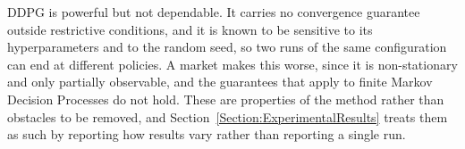 

DDPG is powerful but not dependable. It carries no convergence guarantee outside restrictive conditions, and it is known to be sensitive to its hyperparameters and to the random seed, so two runs of the same configuration can end at different policies. A market makes this worse, since it is non-stationary and only partially observable, and the guarantees that apply to finite Markov Decision Processes do not hold. These are properties of the method rather than obstacles to be removed, and Section~\ref{Section:ExperimentalResults} treats them as such by reporting how results vary rather than reporting a single run.